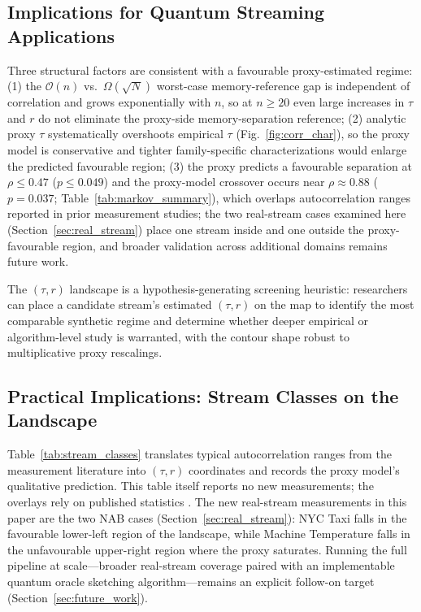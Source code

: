\documentclass[preprint,12pt,authoryear]{elsarticle}
\newcommand{\bigO}{\mathcal{O}}
\begin{document}
\subsection{Implications for Quantum Streaming Applications}

Three structural factors are consistent with a favourable proxy-estimated regime: (1) the $\bigO(n)$ vs.\ $\Omega(\sqrt{N})$ worst-case memory-reference gap is independent of correlation and grows exponentially with $n$, so at $n \geq 20$ even large increases in $\tau$ and $r$ do not eliminate the proxy-side memory-separation reference; (2) analytic proxy $\tau$ systematically overshoots empirical $\tau$ (Fig.~\ref{fig:corr_char}), so the proxy model is conservative and tighter family-specific characterizations would enlarge the predicted favourable region; (3) the proxy predicts a favourable separation at $\rho \leq 0.47$ ($p \leq 0.049$) and the proxy-model crossover occurs near $\rho \approx 0.88$ ($p = 0.037$; Table~\ref{tab:markov_summary}), which overlaps autocorrelation ranges reported in prior measurement studies; the two real-stream cases examined here (Section~\ref{sec:real_stream}) place one stream inside and one outside the proxy-favourable region, and broader validation across additional domains remains future work.

The $(\tau, r)$ landscape is a hypothesis-generating screening heuristic: researchers can place a candidate stream's estimated $(\tau, r)$ on the map to identify the most comparable synthetic regime and determine whether deeper empirical or algorithm-level study is warranted, with the contour shape robust to multiplicative proxy rescalings.

\subsection{Practical Implications: Stream Classes on the Landscape}
\label{sec:practical_impl}

Table~\ref{tab:stream_classes} translates typical autocorrelation ranges from the measurement literature into $(\tau, r)$ coordinates and records the proxy model's qualitative prediction. This table itself reports no new measurements; the overlays rely on published statistics \citep{leland1994ethernet,willinger1997selfsimilarity,beran1994statistics,su2024elasticonline,yan2024bidynamic,gama2014driftsurvey,arora2024driftreview}. The new real-stream measurements in this paper are the two NAB cases (Section~\ref{sec:real_stream}): NYC Taxi falls in the favourable lower-left region of the landscape, while Machine Temperature falls in the unfavourable upper-right region where the proxy saturates. Running the full pipeline at scale---broader real-stream coverage paired with an implementable quantum oracle sketching algorithm---remains an explicit follow-on target (Section~\ref{sec:future_work}).
\end{document}
